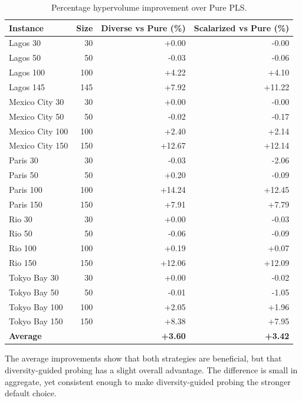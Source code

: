 \documentclass[11pt,a4paper]{article}
\begin{document}
\begin{table}[htbp]
\centering
\caption{Percentage hypervolume improvement over Pure PLS.}
\label{tab:improvement}
\begin{tabular}{lrrr}
\toprule
\textbf{Instance} & \textbf{Size} &
\textbf{Diverse vs Pure (\%)} &
\textbf{Scalarized vs Pure (\%)} \\
\midrule
Lagos 30        &  30 &  +0.00 &  -0.00 \\
Lagos 50        &  50 &  -0.03 &  -0.06 \\
Lagos 100       & 100 &  +4.22 &  +4.10 \\
Lagos 145       & 145 &  +7.92 & +11.22 \\
\midrule
Mexico City 30  &  30 &  +0.00 &  -0.00 \\
Mexico City 50  &  50 &  -0.02 &  -0.17 \\
Mexico City 100 & 100 &  +2.40 &  +2.14 \\
Mexico City 150 & 150 & +12.67 & +12.14 \\
\midrule
Paris 30        &  30 &  -0.03 &  -2.06 \\
Paris 50        &  50 &  +0.20 &  -0.09 \\
Paris 100       & 100 & +14.24 & +12.45 \\
Paris 150       & 150 &  +7.91 &  +7.79 \\
\midrule
Rio 30          &  30 &  +0.00 &  -0.03 \\
Rio 50          &  50 &  -0.06 &  -0.09 \\
Rio 100         & 100 &  +0.19 &  +0.07 \\
Rio 150         & 150 & +12.06 & +12.09 \\
\midrule
Tokyo Bay 30    &  30 &  +0.00 &  -0.02 \\
Tokyo Bay 50    &  50 &  -0.01 &  -1.05 \\
Tokyo Bay 100   & 100 &  +2.05 &  +1.96 \\
Tokyo Bay 150   & 150 &  +8.38 &  +7.95 \\
\midrule
\multicolumn{2}{l}{\textbf{Average}} & \textbf{+3.60} & \textbf{+3.42} \\
\bottomrule
\end{tabular}
\end{table}

The average improvements show that both strategies are beneficial, but
that diversity-guided probing has a slight overall advantage.  The
difference is small in aggregate, yet consistent enough to make
diversity-guided probing the stronger default choice.
\end{document}
